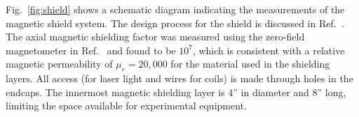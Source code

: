 Fig.~\ref{fig:shield} shows a schematic diagram indicating the
measurements of the magnetic shield system.  The design process for
the shield is discussed in Ref.~\cite{bib:nmor}.  The axial magnetic
shielding factor was measured using the zero-field magnetometer in
Ref.~\cite{bib:nmor} and found to be $10^7$, which is consistent with
a relative magnetic permeability of $\mu_r=20,000$ for the material
used in the shielding layers.  All access (for laser light and wires
for coils) is made through holes in the endcaps.  The innermost
magnetic shielding layer is 4'' in diameter and 8'' long, limiting the
space available for experimental equipment.




